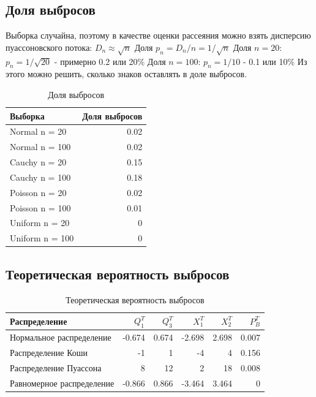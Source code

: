\subsection{Доля выбросов}
Выборка случайна, поэтому в качестве оценки рассеяния можно взять дисперсию пуассоновского потока: $D_n \approx \sqrt{n}$ \newline
Доля $p_n = D_n / n = 1 / \sqrt{n}$ \newline
Доля $n = 20$: $p_n = 1 / \sqrt{20}$ - примерно 0.2 или 20\%\proc \newline
Доля $n = 100$: $p_n = 1 / 10$ - 0.1 или 10\% \newline
Из этого можно решить, сколько знаков оставлять в доле выбросов. \newline

\begin{table}[H]
	\centering
		\begin{tabular}[t]{|l|r|}
			\hline
			Выборка & Доля выбросов\\
			\hline
			Normal n = 20   &  0.02\\
			\hline
			Normal n = 100   &  0.02\\
			\hline
			Cauchy n = 20   &  0.15\\
			\hline
			Cauchy n = 100   &  0.18\\
			\hline
			Poisson n = 20   &  0.02 \\
			\hline
			Poisson n = 100   &  0.01 \\
			\hline
			Uniform n = 20   &  0\\
			\hline
			Uniform n = 100   &  0\\
			\hline
		\end{tabular}
		\caption{Доля выбросов}
		\label{tab:normal}
	\end{table}
	
\subsection{Теоретическая вероятность выбросов}
    \begin{table}[H]
	    \centering
		\begin{tabular}[t]{|l|r|r|r|r|r|}
			\hline
			Распределение   &      $Q_1^T$	& $Q_3^T$ & $X_1^T$ & $X_2^T$ & $P_B^T$	\\
			\hline
			Нормальное распределение 	& -0.674& 0.674 & -2.698 	&  2.698 	& 0.007 \\
			\hline
			Распределение Коши 			& -1	& 1		&  -4		& 4			& 0.156 \\
			\hline
			Распределение Пуассона 		& 8		& 12	& 2			& 18		& 0.008 \\
			\hline
			Равномерное распределение 	&-0.866 & 0.866	& -3.464 	& 3.464 	& 0	\\
			\hline
		\end{tabular}
		\caption{Теоретическая вероятность выбросов}
		\label{tab:normal}
\end{table}